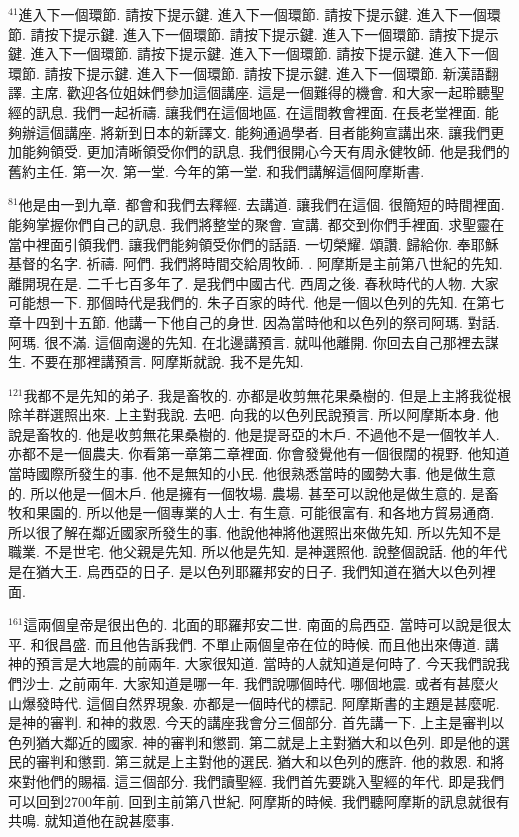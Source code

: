 \documentclass{book}
\begin{document}
$^{41}$進入下一個環節.
請按下提示鍵.
進入下一個環節.
請按下提示鍵.
進入下一個環節.
請按下提示鍵.
進入下一個環節.
請按下提示鍵.
進入下一個環節.
請按下提示鍵.
進入下一個環節.
請按下提示鍵.
進入下一個環節.
請按下提示鍵.
進入下一個環節.
請按下提示鍵.
進入下一個環節.
請按下提示鍵.
進入下一個環節.
新漢語翻譯.
主席.
歡迎各位姐妹們參加這個講座.
這是一個難得的機會.
和大家一起聆聽聖經的訊息.
我們一起祈禱.
讓我們在這個地區.
在這間教會裡面.
在長老堂裡面.
能夠辦這個講座.
將新到日本的新譯文.
能夠通過學者.
目者能夠宣講出來.
讓我們更加能夠領受.
更加清晰領受你們的訊息.
我們很開心今天有周永健牧師.
他是我們的舊約主任.
第一次.
第一堂.
今年的第一堂.
和我們講解這個阿摩斯書.

$^{81}$他是由一到九章.
都會和我們去釋經.
去講道.
讓我們在這個.
很簡短的時間裡面.
能夠掌握你們自己的訊息.
我們將整堂的聚會.
宣講.
都交到你們手裡面.
求聖靈在當中裡面引領我們.
讓我們能夠領受你們的話語.
一切榮耀.
頌讚.
歸給你.
奉耶穌基督的名字.
祈禱.
阿們.
我們將時間交給周牧師.
.
阿摩斯是主前第八世紀的先知.
離開現在是.
二千七百多年了.
是我們中國古代.
西周之後.
春秋時代的人物.
大家可能想一下.
那個時代是我們的.
朱子百家的時代.
他是一個以色列的先知.
在第七章十四到十五節.
他講一下他自己的身世.
因為當時他和以色列的祭司阿瑪. 對話.
阿瑪. 很不滿.
這個南邊的先知.
在北邊講預言.
就叫他離開.
你回去自己那裡去謀生.
不要在那裡講預言.
阿摩斯就說.
我不是先知.

$^{121}$我都不是先知的弟子.
我是畜牧的.
亦都是收剪無花果桑樹的.
但是上主將我從根除羊群選照出來.
上主對我說.
去吧.
向我的以色列民說預言.
所以阿摩斯本身.
他說是畜牧的.
他是收剪無花果桑樹的.
他是提哥亞的木戶.
不過他不是一個牧羊人.
亦都不是一個農夫.
你看第一章第二章裡面.
你會發覺他有一個很闊的視野.
他知道當時國際所發生的事.
他不是無知的小民.
他很熟悉當時的國勢大事.
他是做生意的.
所以他是一個木戶.
他是擁有一個牧場.
農場.
甚至可以說他是做生意的.
是畜牧和果園的.
所以他是一個專業的人士.
有生意.
可能很富有.
和各地方貿易通商.
所以很了解在鄰近國家所發生的事.
他說他神將他選照出來做先知.
所以先知不是職業.
不是世宅.
他父親是先知.
所以他是先知.
是神選照他.
說整個說話.
他的年代是在猶大王.
烏西亞的日子.
是以色列耶羅邦安的日子.
我們知道在猶大以色列裡面.

$^{161}$這兩個皇帝是很出色的.
北面的耶羅邦安二世.
南面的烏西亞.
當時可以說是很太平.
和很昌盛.
而且他告訴我們.
不單止兩個皇帝在位的時候.
而且他出來傳道.
講神的預言是大地震的前兩年.
大家很知道.
當時的人就知道是何時了.
今天我們說我們沙士.
之前兩年.
大家知道是哪一年.
我們說哪個時代.
哪個地震.
或者有甚麼火山爆發時代.
這個自然界現象.
亦都是一個時代的標記.
阿摩斯書的主題是甚麼呢.
是神的審判.
和神的救恩.
今天的講座我會分三個部分.
首先講一下.
上主是審判以色列猶大鄰近的國家.
神的審判和懲罰.
第二就是上主對猶大和以色列.
即是他的選民的審判和懲罰.
第三就是上主對他的選民.
猶大和以色列的應許.
他的救恩.
和將來對他們的賜福.
這三個部分.
我們讀聖經.
我們首先要跳入聖經的年代.
即是我們可以回到2700年前.
回到主前第八世紀.
阿摩斯的時候.
我們聽阿摩斯的訊息就很有共鳴.
就知道他在說甚麼事.
\end{document}
